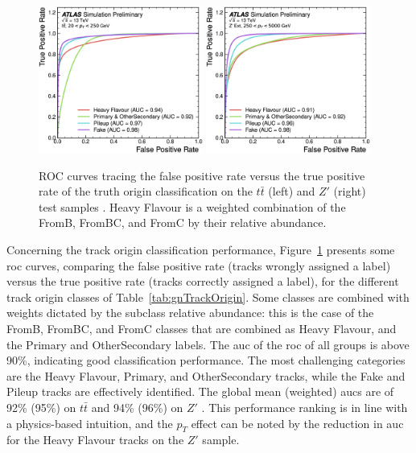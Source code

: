 \begin{figure}[h!]
  \centering
  \includegraphics[width=0.48\textwidth]{Images/FTAG/GN/GN1/ablations/ttroc.png}
  \includegraphics[width=0.48\textwidth]{Images/FTAG/GN/GN1/ablations/zproc.png}
  \caption{ROC curves tracing the false positive rate versus the true positive rate of the truth origin classification on the $t\bar{t}$ (left) and $Z'$ (right) test samples \cite{ATL-PHYS-PUB-2022-027}. Heavy Flavour is a weighted combination of the FromB, FromBC, and FromC by their relative abundance.}
  \label{fig:GN1trackperf}
\end{figure} 

Concerning the track origin classification performance, Figure~\ref{fig:GN1trackperf} presents some \gls{roc} curves, comparing the false positive rate (tracks wrongly assigned a label) versus the true positive rate (tracks correctly assigned a label), for the different track origin classes of Table~\ref{tab:gnTrackOrigin}. Some classes are combined with weights dictated by the subclass relative abundance: this is the case of the FromB, FromBC, and FromC classes that are combined as Heavy Flavour, and the Primary and OtherSecondary labels. The \gls{auc} of the \gls{roc} of all groups is above 90\%, indicating good classification performance. The most challenging categories are the Heavy Flavour, Primary, and OtherSecondary tracks, while the Fake and Pileup tracks are effectively identified. The global mean (weighted) \glspl{auc} are of 92\% (95\%) on $t\bar{t}$ and 94\% (96\%) on $Z'$ \cite{ATL-PHYS-PUB-2022-027}. This performance ranking is in line with a physics-based intuition, and the $p_T$ effect can be noted by the reduction in \gls{auc} for the Heavy Flavour tracks on the $Z'$ sample. \\

